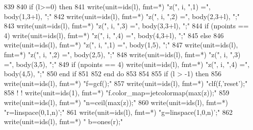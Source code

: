 \begin{DoxyCode}
{839 
840           \textcolor{keywordflow}{if} (l>=0) \textcolor{keywordflow}{then}
841               \textcolor{keyword}{write}(unit=ids(l), fmt=*) \textcolor{stringliteral}{"z("}, i, \textcolor{stringliteral}{",1) ="}, body(1,3+l), \textcolor{stringliteral}{";"}
842               \textcolor{keyword}{write}(unit=ids(l), fmt=*) \textcolor{stringliteral}{"z("}, i, \textcolor{stringliteral}{",2) ="}, body(2,3+l), \textcolor{stringliteral}{";"}
843               \textcolor{keyword}{write}(unit=ids(l), fmt=*) \textcolor{stringliteral}{"z("}, i, \textcolor{stringliteral}{",3) ="}, body(3,3+l), \textcolor{stringliteral}{";"}
844             \textcolor{keywordflow}{if} (npoints == 4) \textcolor{keyword}{write}(unit=ids(l), fmt=*) \textcolor{stringliteral}{"z("}, i, \textcolor{stringliteral}{",4) ="}, body(\textcolor{comment}{4,3+l), }\textcolor{stringliteral}{";"}
845           \textcolor{keywordflow}{else}
846             \textcolor{keyword}{write}(unit=ids(l), fmt=*) \textcolor{stringliteral}{"z("}, i, \textcolor{stringliteral}{",1) ="}, body(1,5), \textcolor{stringliteral}{";"}
847             \textcolor{keyword}{write}(unit=ids(l), fmt=*) \textcolor{stringliteral}{"z("}, i, \textcolor{stringliteral}{",2) ="}, body(2,5), \textcolor{stringliteral}{";"}
848             \textcolor{keyword}{write}(unit=ids(l), fmt=*) \textcolor{stringliteral}{"z("}, i, \textcolor{stringliteral}{",3) ="}, body(3,5), \textcolor{stringliteral}{";"}
849             \textcolor{keywordflow}{if} (npoints == 4) \textcolor{keyword}{write}(unit=ids(l), fmt=*) \textcolor{stringliteral}{"z("}, i, \textcolor{stringliteral}{",4) ="}, body(\textcolor{comment}{4,5), }\textcolor{stringliteral}{";"}
850 \textcolor{keywordflow}{          end if}
851 
852 \textcolor{keywordflow}{        end do}
853         
854     
855         \textcolor{keywordflow}{if} (l > -1) \textcolor{keywordflow}{then}
856           \textcolor{keyword}{write}(unit=ids(l), fmt=*) \textcolor{stringliteral}{"f=gcf();"}
857           \textcolor{keyword}{write}(unit=ids(l), fmt=*) \textcolor{stringliteral}{"clf(f,'reset');"}
858     \textcolor{comment}{! !       write(unit=ids(1), fmt=*) "f.color\_map=jetcolormap(max(z));"}
859           \textcolor{keyword}{write}(unit=ids(l), fmt=*) \textcolor{stringliteral}{"n=ceil(max(z));"}
860           \textcolor{keyword}{write}(unit=ids(l), fmt=*)  \textcolor{stringliteral}{"r=linspace(0,1,n)';"}
861           \textcolor{keyword}{write}(unit=ids(l), fmt=*)  \textcolor{stringliteral}{"g=linspace(1,0,n)';"}
862           \textcolor{keyword}{write}(unit=ids(l), fmt=*)  \textcolor{stringliteral}{" b=ones(r);"}
}
\end{DoxyCode}
